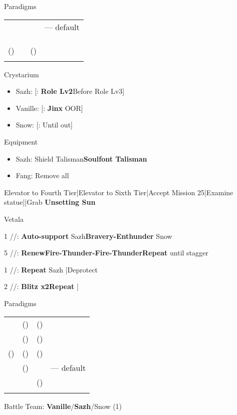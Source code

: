 \begin{menu}
	\item Paradigms
	\begin{tabular}{cccl}
		\syn   & \sab & \rav   & --- default \\
		\com   & \med & \com   &             \\
		\syn   & \med & \com   &             \\
		\com   & \sab & \com   &             \\
		(\rav) & \sab & (\rav) &             \\
		\com   & \rav & \com   &
	\end{tabular}
	\item Crystarium
	\begin{itemize}
		\item Sazh: [\rav: \textbf{Role Lv2}\to Before Role Lv3]
		\item Vanille: [\sab: \textbf{Jinx} OOR]
		\item Snow: [\sen: Until out]
	\end{itemize}
	\item Equipment
	\begin{itemize}
		\item Sazh: Shield Talisman\to \textbf{Soulfont Talisman}
		\item Fang: Remove all
	\end{itemize}
\end{menu}
\begin{mainlist}
	\item Elevator to Fourth Tier|Elevator to Sixth Tier|Accept Mission 25|Examine statue|\skip|Grab \textbf{Unsetting Sun}
\end{mainlist}
\begin{fight}{Vetala}
	\item [1] \syn/\sab/\rav: \textbf{Auto-support} Sazh\to \textbf{Bravery-Enthunder} Snow
	\item [5] \rav/\sab/\rav: \textbf{Renew}\to \textbf{Fire-Thunder-Fire-Thunder}\to \textbf{Repeat} until stagger
	\item [1] \syn/\sab/\rav: \textbf{Repeat} Sazh |Deprotect
	\item [2] \com/\med/\com: \textbf{Blitz x2}\to \textbf{Repeat} |\skip
\end{fight}
\begin{menu}
	\item Paradigms
	\begin{tabular}{cccl}
		\syn   & (\rav) & (\sen) &             \\
		\com   & (\rav) & (\rav) &             \\
		(\rav) & (\rav) & (\sen) &             \\
		\com   & (\rav) & \com   & --- default \\
		\rav   & \sab   & (\sen) &             \\
		\com   & \rav   & \com   &
	\end{tabular}
	\item Battle Team: \textbf{Vanille}/\textbf{Sazh}/Snow (1)
\end{menu}
